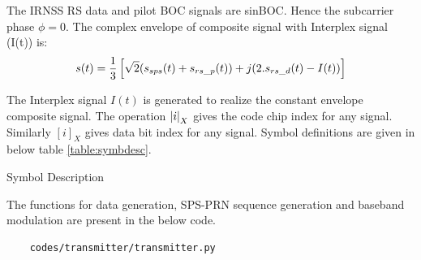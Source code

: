 \noindent The IRNSS RS data and pilot BOC signals are sinBOC. Hence the subcarrier phase $\phi=0$.
The complex envelope of composite signal with Interplex signal (I(t)) is:
\begin{equation}
s(t) = \dfrac{1}{3} {}\left[\sqrt{2} (s_{sps}(t) + s_{rs\_p}(t)) + j(2. s_{rs\_d}(t) - I(t))\right] 
\end{equation}

\noindent The Interplex signal $I(t)$ is generated to realize the constant envelope composite signal. The operation $\left\vert i\right\vert_X$ gives the code chip index for any signal. Similarly $[i]_X$ gives data bit index for any signal.
Symbol definitions are given in below table \ref{table:symbdesc}.

\begin{table}[h]

\vspace{3mm}
\caption{Symbol Description}
\label{table:symbdesc}
\end{table}

The functions for data generation, SPS-PRN sequence generation and baseband modulation are present in the below code.
\begin{lstlisting}
    codes/transmitter/transmitter.py
\end{lstlisting}
\let\cleardoublepage\clearpage
